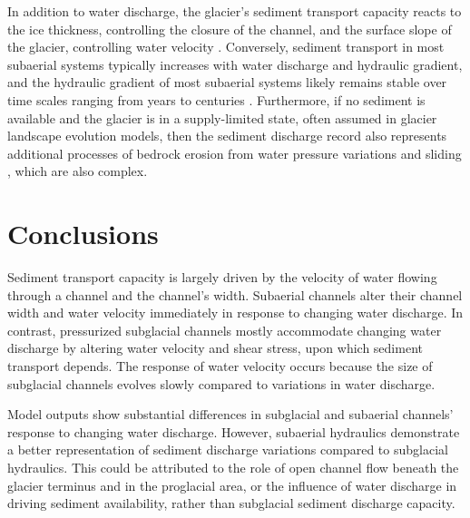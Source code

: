 \documentclass[11pt]{article}
\begin{document}
In addition to water discharge, the glacier's sediment transport capacity reacts to the ice thickness, controlling the closure of the channel, and the surface slope of the glacier, controlling water velocity \citep[Section~\ref{sect:sub_mode}; ][]{rothlisberger1972,shreve1972,stevens2022}.
Conversely, sediment transport in most subaerial systems typically increases with water discharge and hydraulic gradient, and the hydraulic gradient of most subaerial systems likely remains stable over time scales ranging from years to centuries \citep[Section~\ref{sect:fluv}; e.g.][]{muller1968,whipple1999,wong2006,wickert2019}. 
Furthermore, if no sediment is available and the glacier is in a supply-limited state, often assumed in glacier landscape evolution models, then the sediment discharge record also represents additional processes of bedrock erosion from  water pressure variations and sliding  \citep{iverson2012,herman2015}, which are also complex.


\section{Conclusions}
Sediment transport capacity is largely driven by the velocity of water flowing through a channel and the channel's width.
Subaerial channels  alter their channel width and water velocity immediately in response to changing water discharge.
In contrast, pressurized subglacial channels mostly accommodate changing water discharge by altering water velocity and shear stress, upon which sediment transport depends.
The response of water velocity occurs because the size of subglacial channels evolves slowly compared to variations in water discharge.

Model outputs show substantial differences in subglacial and subaerial channels' response to changing water discharge. However, subaerial hydraulics demonstrate a better representation of sediment discharge variations compared to subglacial hydraulics.
This could be attributed to the role of open channel flow beneath the glacier terminus and in the proglacial area, or the influence of water discharge in driving sediment availability, rather than subglacial sediment discharge capacity.
\end{document}
